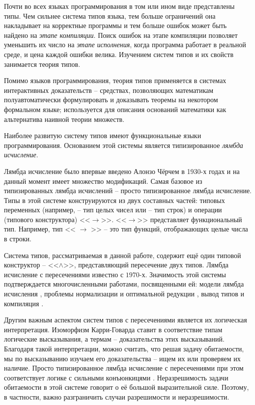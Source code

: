 \documentclass[../main.tex]{subfiles}
\begin{document}
 \label{sec:introduction}

Почти во всех языках программирования в том или ином виде представлены типы. Чем сильнее система типов языка, тем больше ограничений она накладывает на корректные программы и тем больше ошибок может быть найдено на {\it этапе компиляции}. Поиск ошибок на этапе компиляции позволяет уменьшить их число на {\it этапе исполнения}, когда программа работает в реальной среде, и цена каждой ошибки велика. Изучением систем типов и их свойств занимается теория типов. 

Помимо языков программирования, теория типов применяется в системах интерактивных доказательств -- средствах, позволяющих математикам полуавтоматически формулировать и доказывать теоремы на некотором формальном языке; используется для описания оснований математики как альтернатива наивной теории множеств.

\emptyline

Наиболее развитую систему типов имеют функциональные языки программирования. Основанием этой системы является типизированное {\it лямбда исчисление}.

Лямбда исчисление было впервые введено Алонзо Чёрчем в 1930-х годах и на данный момент имеет множество модификаций. Самая базовое из типизированных лямбда исчислений -- просто типизированное лямбда исчисление. Типы в этой системе конструируются из двух составных частей: типовых переменных (например,  -- тип целых чисел или  -- тип строк) и операции (типового конструктора) <<$\to$>>. <<$\to$>> представляет функциональный тип. Например, тип << $\to$ >> -- это тип функций, отображающих целые числа в строки. 

Система типов, рассматриваемая в данной работе, содержит ещё один типовой конструктор -- <<$\wedge$>>, представляющий пересечение двух типов. Лямбда исчисление с пересечениями известно с $1970$-х. Значимость этой системы подтверждается многочисленными работами, посвященными ей: модели лямбда исчисления \cite{alessi_2006, coppo_1980}, проблемы нормализации и оптимальной редукции \cite{neergaard_2004, pottinger_1980}, вывод типов и компиляция \cite{kfoury_2004, wells_2002}.

Другим важным аспектом систем типов с пересечениями является их логическая интерпретация. Изоморфизм Карри-Говарда ставит в соответствие типам логические высказывания, а термам -- доказательства этих высказываний. 
Благодаря такой интерпретации, можно считать, что решая задачу обитаемости, мы по высказыванию изучаем его доказательства -- ищем их или проверяем их наличие.
Просто типизированное лямбда исчисление с пересечениями при этом соответствует логике с сильными конъюнкицями \cite{lopez-escobar_1985, mints_1989}. Неразрешимость задачи обитаемости в этой системе \cite{urzyczyn_1999} говорит о её большой выразительной силе. Поэтому, в частности, важно разграничить случаи разрешимости и неразрешимости. 
\end{document}
